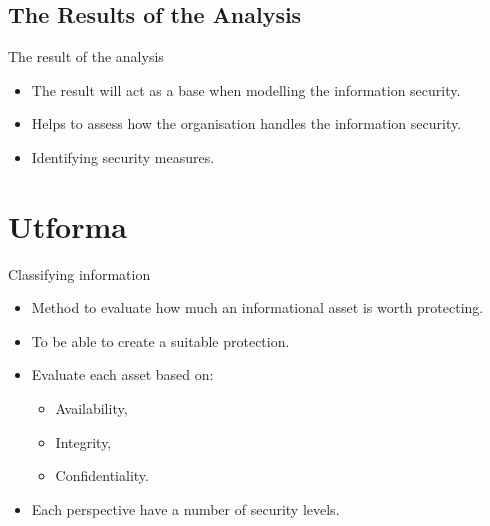 \documentclass{beamer}
\begin{document}
\subsection{The Results of the Analysis}
\begin{frame}{The result of the analysis}
  \begin{itemize}
    \item The result will act as a base when modelling the information security.
    \item Helps to assess how the organisation handles the information security.
    \item Identifying security measures.
  \end{itemize}
  
\end{frame}

\section{Utforma}
\begin{frame}{Classifying information}
  \begin{itemize}
    \item Method to evaluate how much an informational asset is worth
      protecting.

    \item To be able to create a suitable protection.

    \item Evaluate each asset based on:
      \begin{itemize}
        \item Availability,
        \item Integrity,
        \item Confidentiality.
      \end{itemize}

    \item Each perspective have a number of security levels.

  \end{itemize}
\end{frame}
\end{document}
